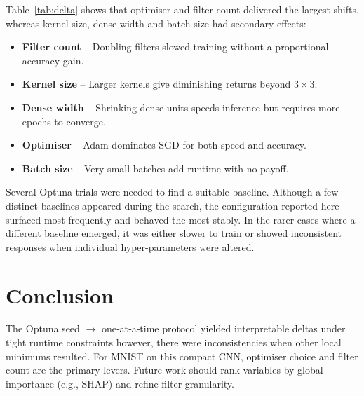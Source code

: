 \documentclass[12pt]{article}
\begin{document}
Table~\ref{tab:delta} shows that optimiser and filter count delivered the
largest shifts, whereas kernel size, dense width and batch size had
secondary effects:

\begin{itemize}\setlength\itemsep{0.6em}
  \item \textbf{Filter count} – Doubling filters slowed training without a
        proportional accuracy gain.
  \item \textbf{Kernel size} – Larger kernels give diminishing returns beyond
        $3\times3$.
  \item \textbf{Dense width} – Shrinking dense units speeds inference but
        requires more epochs to converge.
  \item \textbf{Optimiser} – Adam dominates SGD for both speed and accuracy.
  \item \textbf{Batch size} – Very small batches add runtime with no payoff.
\end{itemize}

\noindent Several Optuna trials were needed to find a suitable baseline. Although a few distinct baselines appeared during the search, the configuration reported here surfaced most frequently and behaved the most stably. In the rarer cases where a different baseline emerged, it was either slower to train or showed inconsistent responses when individual hyper-parameters were altered.

\section{Conclusion}

The Optuna seed $\to$ one‑at‑a‑time protocol yielded interpretable deltas under
tight runtime constraints however, there were inconsistencies when other local minimums resulted.  For MNIST on this compact CNN, optimiser choice and
filter count are the primary levers.  Future work should rank variables by
global importance (e.g., SHAP) and refine filter granularity.

\nocite{*} %


\end{document}
